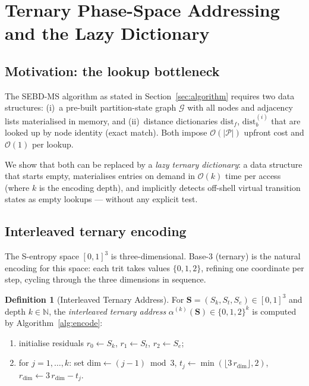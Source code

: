 \documentclass[twocolumn,10pt,a4paper]{article}
\theoremstyle{thmstyle}
\theoremstyle{definition}
\newtheorem{definition}[theorem]{Definition}
\theoremstyle{remark}
\newcommand{\N}{\mathbb{N}}
\newcommand{\Parts}{\mathcal{P}}
\newcommand{\Sv}{\mathbf{S}}
\newcommand{\Sk}{S_{k}}
\newcommand{\St}{S_{t}}
\newcommand{\Se}{S_{e}}
\newcommand{\calG}{\mathcal{G}}
\begin{document}
\section{Ternary Phase-Space Addressing and the Lazy Dictionary}
\label{sec:ternary}

\subsection{Motivation: the lookup bottleneck}

The SEBD-MS algorithm as stated in Section~\ref{sec:algorithm} requires
two data structures: (i)~a pre-built partition-state graph $\calG$ with
all nodes and adjacency lists materialised in memory, and (ii)~distance
dictionaries $\text{dist}_f$, $\text{dist}_b^{(i)}$ that are looked up
by node identity (exact match). Both impose $\mathcal{O}(|\Parts|)$
upfront cost and $\mathcal{O}(1)$ per lookup.

We show that both can be replaced by a \emph{lazy ternary dictionary}:
a data structure that starts empty, materialises entries on demand in
$\mathcal{O}(k)$ time per access (where $k$ is the encoding depth), and
implicitly detects off-shell virtual transition states as empty lookups
--- without any explicit test.

\subsection{Interleaved ternary encoding}

The S-entropy space $[0,1]^3$ is three-dimensional. Base-3 (ternary)
is the natural encoding for this space: each trit takes values
$\{0,1,2\}$, refining one coordinate per step, cycling through the
three dimensions in sequence.

\begin{definition}[Interleaved Ternary Address]
\label{def:ternary}
For $\Sv = (\Sk, \St, \Se) \in [0,1]^3$ and depth $k \in \N$, the
\emph{interleaved ternary address} $\alpha^{(k)}(\Sv) \in \{0,1,2\}^k$
is computed by Algorithm~\ref{alg:encode}:
\begin{enumerate}[nosep,label=(\roman*)]
\item initialise residuals $r_0 \leftarrow \Sk$,
  $r_1 \leftarrow \St$, $r_2 \leftarrow \Se$;
\item for $j = 1, \ldots, k$:
  set $\text{dim} \leftarrow (j-1) \bmod 3$,
  $t_j \leftarrow \min(\lfloor 3\,r_{\text{dim}}\rfloor, 2)$,
  $r_{\text{dim}} \leftarrow 3\,r_{\text{dim}} - t_j$.
\end{enumerate}
\end{definition}
\end{document}
